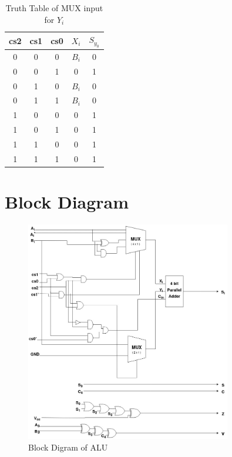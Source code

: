 \documentclass{article}
\begin{document}
\begin{table}[H]
	
	\centering
	\begin{tabular}{|c|c|c|c|c|}
		\hline
		cs2 & cs1 & cs0 & $X_{i}$ & $S_{y_0}$  \\
		\hline
		0 & 0 & 0 & $B_{i}$ & 0 \\
		0 & 0 & 1 & 0 & 1 \\
		0 & 1 & 0 & $B_{i}$ & 0  \\
		0 & 1 & 1 & $B_{i}$ & 0  \\
		1 & 0 & 0 & 0 & 1\\
		1 & 0 & 1 & 0 & 1\\
		1 & 1 & 0 & 0 & 1\\
		1 & 1 & 1 & 0 & 1\\
		\hline
	\end{tabular}
	\caption{Truth Table of MUX input for $Y_i$}
	\label{tab:truth_table3}
\end{table}












\section{\large{Block Diagram}}
\vspace{15mm}
\begin{figure}[H]
    \centering
    \includegraphics[width=0.8\textwidth]{images/block-new.jpg}
    \caption{ Block Digram of ALU }
    \label{fig:enter-label}
\end{figure}
\end{document}
